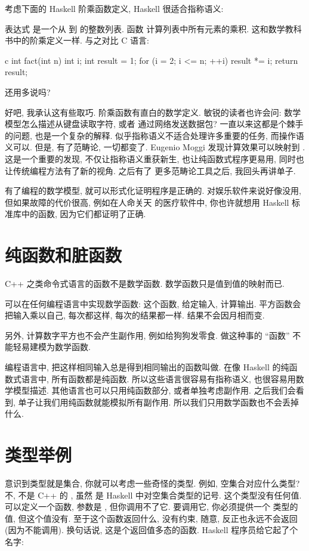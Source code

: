 考虑下面的 Haskell 阶乘函数定义, Haskell 很适合指称语义:

表达式 \code{[1..n]} 是一个从  到  的整数列表. 函数  计算列表中所有元素的乘积.
这和数学教科书中的阶乘定义一样. 与之对比 C 语言:

\begin{snip}{c}
int fact(int n) {
    int i;
    int result = 1;
    for (i = 2; i <= n; ++i)
        result *= i;
    return result;
}
\end{snip}
还用多说吗?

好吧, 我承认这有些取巧. 阶乘函数有直白的数学定义. 敏锐的读者也许会问: 数学模型怎么描述从键盘读取字符, 或者
通过网络发送数据包? 一直以来这都是个棘手的问题, 也是一个复杂的解释. 似乎指称语义不适合处理许多重要的任务,
而操作语义可以. 但是, 有了范畴论, 一切都变了. Eugenio Moggi 发现计算效果可以映射到 .
这是一个重要的发现, 不仅让指称语义重获新生, 也让纯函数式程序更易用, 同时也让传统编程方法有了新的视角. 之后有了
更多范畴论工具之后, 我回头再讲单子.

有了编程的数学模型, 就可以形式化证明程序是正确的. 对娱乐软件来说好像没用, 但如果故障的代价很高, 例如在人命关天
的医疗软件中, 你也许就想用 Haskell 标准库中的函数, 因为它们都证明了正确.

\section{纯函数和脏函数}

C++ 之类命令式语言的函数不是数学函数. 数学函数只是值到值的映射而已.

可以在任何编程语言中实现数学函数: 这个函数, 给定输入, 计算输出. 平方函数会把输入乘以自己, 每次都这样,
每次的结果都一样. 结果不会因月相而变.

另外, 计算数字平方也不会产生副作用, 例如给狗狗发零食. 做这种事的 ``函数'' 不能轻易建模为数学函数.

编程语言中, 把这样相同输入总是得到相同输出的函数叫做. 在像
Haskell 的纯函数式语言中, 所有函数都是纯函数. 所以这些语言很容易有指称语义, 也很容易用数学模型描述.
其他语言也可以只用纯函数部分, 或者单独考虑副作用. 之后我们会看到, 单子让我们用纯函数就能模拟所有副作用.
所以我们只用数学函数也不会丢掉什么.

\section{类型举例}

意识到类型就是集合, 你就可以考虑一些奇怪的类型. 例如, 空集合对应什么类型? 不, 不是 C++ 的 ,
虽然  是 Haskell 中对空集合类型的记号. 这个类型没有任何值. 可以定义一个函数, 参数是 ,
但你调用不了它. 要调用它, 你必须提供一个  类型的值, 但这个值没有. 至于这个函数返回什么, 没有约束,
随意, 反正也永远不会返回(因为不能调用). 换句话说, 这是个返回值多态的函数. Haskell 程序员给它起了个名字:

